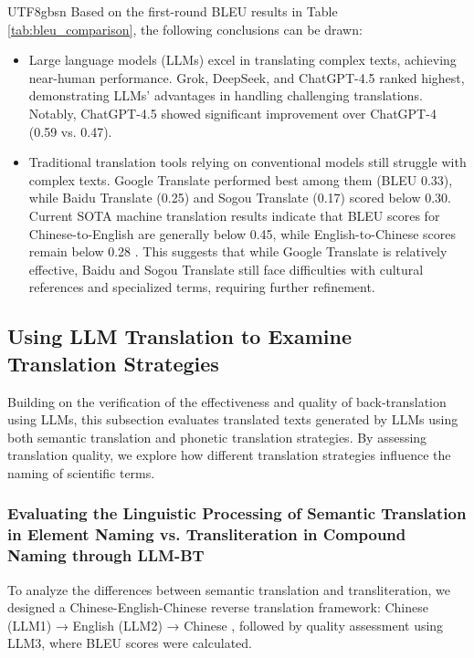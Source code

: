 \documentclass[conference]{IEEEtran}
\begin{document}
\begin{CJK*}{UTF8}{gbsn}
Based on the first-round BLEU results in Table \ref{tab:bleu_comparison}, the following conclusions can be drawn:
\begin{itemize}
 \item Large language models (LLMs) excel in translating complex texts, achieving near-human performance. Grok, DeepSeek, and ChatGPT-4.5 ranked highest, demonstrating LLMs' advantages in handling challenging translations. Notably, ChatGPT-4.5 showed significant improvement over ChatGPT-4 (0.59 vs. 0.47).
 \item Traditional translation tools relying on conventional models still struggle with complex texts. Google Translate performed best among them (BLEU 0.33), while Baidu Translate (0.25) and Sogou Translate (0.17) scored below 0.30. Current SOTA machine translation results indicate that BLEU scores for Chinese-to-English are generally below 0.45, while English-to-Chinese scores remain below 0.28 \citep{zhu2025overcoming}. This suggests that while Google Translate is relatively effective, Baidu and Sogou Translate still face difficulties with cultural references and specialized terms, requiring further refinement. 
\end{itemize}

\subsection{Using LLM Translation to Examine Translation Strategies}
Building on the verification of the effectiveness and quality of back-translation using LLMs, this subsection evaluates translated texts generated by LLMs using both semantic translation and phonetic translation strategies. By assessing translation quality, we explore how different translation strategies influence the naming of scientific terms.

\subsubsection{Evaluating the Linguistic Processing of Semantic Translation in Element Naming vs. Transliteration in Compound Naming through LLM-BT}
To analyze the differences between semantic translation and transliteration, we designed a Chinese-English-Chinese reverse translation framework: Chinese (LLM1) → English (LLM2) → Chinese \cite{weigang2025a}, followed by quality assessment using LLM3, where BLEU scores were calculated.


\end{CJK*}
\end{document}

